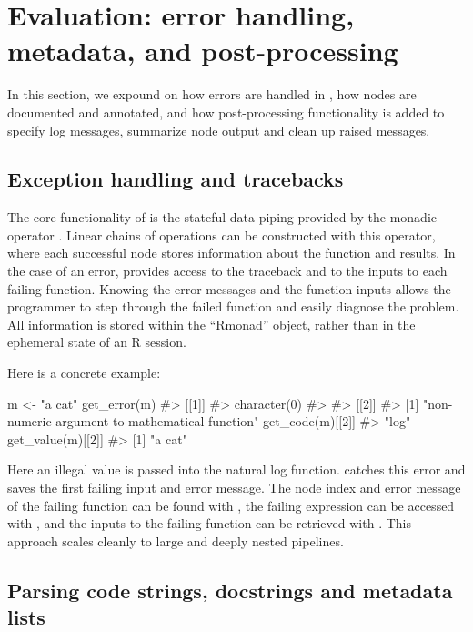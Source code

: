 \section{Evaluation: error handling, metadata, and post-processing}

In this section, we expound on how errors are handled in , how nodes are documented and annotated, and how post-processing functionality is added to specify log messages, summarize node output and clean up raised messages.

\subsection{Exception handling and tracebacks}

The core functionality of  is the stateful data piping provided
by the monadic operator \code{\%>{}>\%}.  Linear chains of operations can be
constructed with this operator, where each successful node stores information
about the function and results. In the case of an error, 
provides access to the traceback and to the inputs to each failing function.
Knowing the error messages and the function inputs allows the programmer to
step through the failed function and easily diagnose the problem. All
information is stored within the ``Rmonad'' object, rather than in the ephemeral
state of an R session.

Here is a concrete example:

\begin{example}
m <- "a cat" %
get_error(m)
#> [[1]]
#> character(0)
#> 
#> [[2]]
#> [1] "non-numeric argument to mathematical function"
get_code(m)[[2]]
#> "log"
get_value(m)[[2]]
#> [1] "a cat"
\end{example}

\noindent

Here an illegal value is passed into the natural log function. 
catches this error and saves the first failing input and error message. The
node index and error message of the failing function can be found with
, the failing expression can be accessed with
, and the inputs to the failing function can be retrieved with
. This approach scales cleanly to large and deeply nested
pipelines.


\subsection{Parsing code strings, docstrings and metadata lists}

